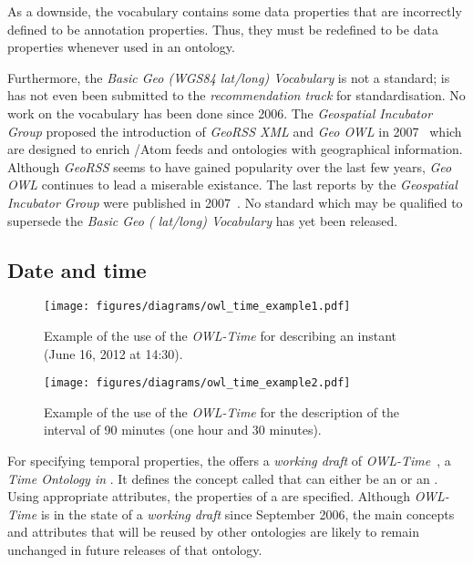As a downside, the vocabulary contains some data properties that are incorrectly defined to be annotation properties. Thus, they must be redefined to be data properties whenever used in an  ontology.

Furthermore, the \emph{Basic Geo (WGS84 lat/long) Vocabulary} is not a standard; is has not even been submitted to the \emph{ recommendation track} for standardisation. No work on the vocabulary has been done since 2006. The \emph{ Geospatial Incubator Group} proposed the introduction of \emph{GeoRSS XML} and \emph{Geo OWL} in 2007~\cite{w3c_geo_report1} which are designed to enrich /Atom feeds and  ontologies with geographical information. Although \emph{GeoRSS} seems to have gained popularity over the last few years, \emph{Geo OWL} continues to lead a miserable existance. The last reports by the \emph{ Geospatial Incubator Group} were published in 2007~\cite{w3c_geo_report1,w3c_geo_report2}. No standard which may be qualified to supersede the \emph{Basic Geo ( lat/long) Vocabulary} has yet been released.

\subsection{Date and time}
\label{subsec:date_ontologies}

\begin{figure}
\centering
\texttt{[image: figures/diagrams/owl\_time\_example1.pdf]}
\caption{Example of the use of the \emph{OWL-Time} for describing an instant (June 16, 2012 at 14:30).}
\label{fig:owl_time_example1}
\end{figure}

\begin{figure}
\centering
\texttt{[image: figures/diagrams/owl\_time\_example2.pdf]}
\caption{Example of the use of the \emph{OWL-Time} for the description of the interval of 90 minutes (one hour and 30 minutes).}
\label{fig:owl_time_example2}
\end{figure}

For specifying temporal properties, the  offers a \emph{working draft} of \emph{OWL-Time}~\cite{owl-time}, a \emph{Time Ontology in }. It defines the concept called  that can either be an  or an . Using appropriate attributes, the properties of a  are specified. Although \emph{OWL-Time} is in the state of a \emph{working draft} since September 2006, the main concepts and attributes that will be reused by other ontologies are likely to remain unchanged in future releases of that ontology.

